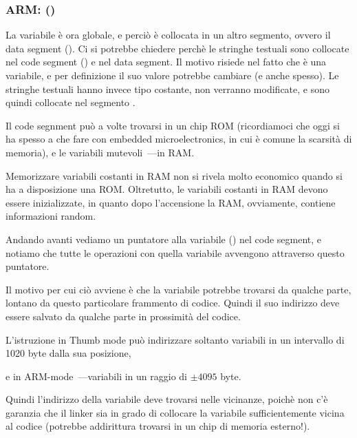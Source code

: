 \subsubsection{ARM: \OptimizingKeilVI (\ThumbMode)}



La variabile  è ora globale, e perciò è collocata in un altro segmento, ovvero il data segment ().
Ci si potrebbe chiedere perchè le stringhe testuali sono collocate nel code segment () e  nel data segment.
Il motivo risiede nel fatto che  è una variabile, e per definizione il suo valore potrebbe cambiare (e anche spesso).
Le stringhe testuali hanno invece tipo costante, non verranno modificate, e sono quindi collocate nel segmento .
\myindex{\RAM}
\myindex{\ROM}

Il code segnment può a volte trovarsi in un chip \ac{ROM} (ricordiamoci che oggi si ha spesso a che fare con embedded microelectronics, in cui è comune la scarsità di memoria), e le variabili mutevoli~---in \ac{RAM}.

Memorizzare variabili costanti in RAM non si rivela molto economico quando si ha a disposizione una ROM.
Oltretutto, le variabili costanti in RAM devono essere inizializzate, in quanto dopo l'accensione la RAM, ovviamente, contiene informazioni random.


Andando avanti vediamo un puntatore alla variabile  () nel code segment, e notiamo che tutte le operazioni con quella variabile avvengono attraverso questo puntatore.

Il motivo per cui ciò avviene è che la variabile  potrebbe trovarsi da qualche parte, lontano da questo particolare frammento di codice. Quindi il suo indirizzo deve essere salvato da qualche parte in prossimità del codice.

L'istruzione  in Thumb mode può indirizzare soltanto variabili in un intervallo di 1020 byte dalla sua posizione, 

e in ARM-mode~---variabili in un raggio di $\pm{}4095$ byte.

Quindi l'indirizzo della variabile  deve trovarsi nelle vicinanze, poichè non c'è garanzia che il linker sia in grado di collocare la variabile sufficientemente vicina al codice (potrebbe addirittura trovarsi in un chip di memoria esterno!).

